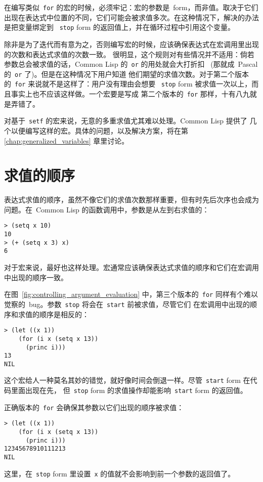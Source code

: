 在编写类似~\texttt{for} 的宏的时候，必须牢记：宏的参数是~form，而非值。取决于它们
出现在表达式中位置的不同，它们可能会被求值多次。在这种情况下，解决的办法是把变量绑定到
~\texttt{stop} form 的返回值上，并在循环过程中引用这个变量。

除非是为了迭代而有意为之，否则编写宏的时候，应该确保表达式在宏调用里出现的次数和表达式求值的次数一致。
很明显，这个规则对有些情况并不适用：倘若参数总会被求值的话，Common Lisp 的~\verb|or| 的用处就会大打折扣
~(那就成~Pascal 的~\verb|or| 了)。但是在这种情况下用户知道
他们期望的求值次数。对于第二个版本的~\verb|for| 来说就不是这样了：用户没有理由会想要
~\verb|stop| form 被求值一次以上，而且事实上也不应该这样做。一个宏要是写成
第二个版本的~\verb|for| 那样，十有八九就是弄错了。

对基于~\verb|setf| 的宏来说，无意的多重求值尤其难以处理。Common Lisp 提供了
几个\utility{}以便编写这样的宏。具体的问题，以及解决方案，将在第~%
\ref{chap:generalized_variables} 章里讨论。

\section{求值的顺序}
\label{sec:order_of_evaluation}

表达式求值的顺序，虽然不像它们的求值次数那样重要，但有时先后次序也会成为问题。在~Common Lisp
的函数调用中，参数是从左到右求值的：
\begin{lstlisting}
> (setq x 10)
10
> (+ (setq x 3) x)
6
\end{lstlisting}
对于宏来说，最好也这样处理。宏通常应该确保表达式求值的顺序和它们在宏调用中出现的顺序一致。

在图~\ref{fig:controlling_argument_evaluation} 中，第三个版本的~\texttt{for} 
同样有个难以觉察的~bug。参数~\texttt{stop} 将会在~\texttt{start} 前被求值，尽管它们
在宏调用中出现的顺序和求值的顺序是相反的：
\begin{lstlisting}
> (let ((x 1))
    (for (i x (setq x 13))
      (princ i)))
13
NIL
\end{lstlisting}
这个宏给人一种莫名其妙的错觉，就好像时间会倒退一样。尽管~\verb|start| form 在代码里面出现在先，
但~\verb|stop| form 的求值操作却能影响~\verb|start| form 的返回值。

正确版本的~\verb|for| 会确保其参数以它们出现的顺序被求值：
\begin{lstlisting}
> (let ((x 1))
    (for (i x (setq x 13))
      (princ i)))
12345678910111213
NIL
\end{lstlisting}
这里，在~\texttt{stop} form 里设置~\texttt{x} 的值就不会影响到前一个参数的返回值了。

